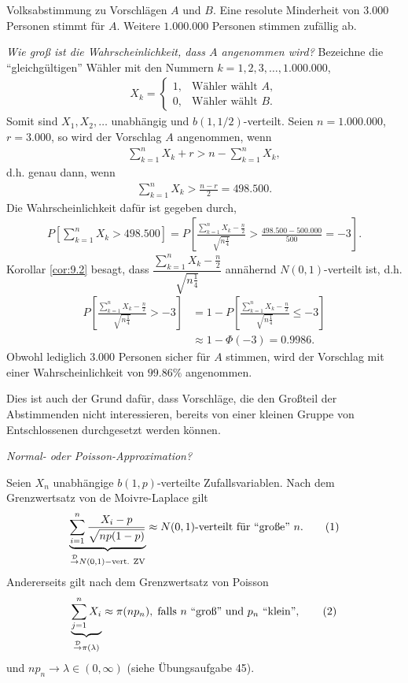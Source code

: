 \begin{bsp}
Volksabstimmung zu Vorschlägen $A$ und $B$. Eine resolute Minderheit
von $3.000$ Personen stimmt für $A$. Weitere $1.000.000$ Personen stimmen
zufällig ab.

\textit{Wie groß ist die Wahrscheinlichkeit, dass $A$ angenommen wird?}
Bezeichne die ``gleichgültigen'' Wähler mit den Nummern
$k=1,2,3,\ldots,1.000.000$,
\begin{align*}
X_k = \begin{cases}
1, & \text{Wähler wählt }A,\\
0, & \text{Wähler wählt }B.
\end{cases}
\end{align*}
Somit sind $X_1,X_2,\ldots$ unabhängig und $b(1,1/2)$-verteilt. Seien
$n=1.000.000$, $r=3.000$, so wird der Vorschlag $A$ angenommen, wenn
\begin{align*}
\sum_{k=1}^n X_k + r > n - \sum\limits_{k=1}^n X_k,
\end{align*}
d.h. genau dann, wenn
\begin{align*}
\sum_{k=1}^n X_k > \frac{n-r}{2} = 498.500.
\end{align*}
Die Wahrscheinlichkeit dafür ist gegeben durch,
\begin{align*}
P[\sum_{k=1}^n X_k > 498.500]
= P\left[\frac{\sum_{k=1}^n X_k - \frac{n}{2}}{\sqrt{n\frac{1}{4}}} >
\frac{498.500 - 500.000}{500} = -3\right].
\end{align*}
Korollar \ref{cor:9.2} besagt, dass $\dfrac{\sum_{k=1}^n X_k -
\frac{n}{2}}{\sqrt{n\frac{1}{4}}}$ annähernd $N(0,1)$-verteilt ist, d.h.
\begin{align*}
P\left[\frac{\sum_{k=1}^n X_k - \frac{n}{2}}{\sqrt{n\frac{1}{4}}} >
-3\right] &= 1- P\left[\frac{\sum_{k=1}^n X_k -
\frac{n}{2}}{\sqrt{n\frac{1}{4}}} \le -3\right]\\ &
 \approx 1-\Phi(-3) = 0.9986.
\end{align*}
Obwohl lediglich 3.000 Personen sicher für $A$ stimmen, wird der Vorschlag
mit einer Wahrscheinlichkeit von $99.86\%$ angenommen.

Dies ist auch der Grund dafür, dass Vorschläge, die den Großteil der
Abstimmenden nicht interessieren, bereits von einer kleinen Gruppe von
Entschlossenen durchgesetzt werden können.\bsphere
\end{bsp}

\noindent
\textit{Normal- oder Poisson-Approximation?} 

Seien $X_n$ unabhängige $b(1,p)$-verteilte Zufallsvariablen. Nach dem
Grenzwertsatz von de Moivre-Laplace gilt
\begin{align*}
\underbrace{\sum_{i=1}^n\frac{X_i-p}{\sqrt{np(1-p)}}}_{\overset{\mathcal{D}}{\to} N(0,1)-\text{vert.
ZV}} \approx N(0,1)\text{-verteilt für ``große'' }n.\tag{1}
\end{align*}
Andererseits gilt nach dem Grenzwertsatz von Poisson
\begin{align*}
\underbrace{\sum_{j=1}^n X_i}_{\overset{\mathcal{D}}{\to} \pi(\lambda)} \approx \pi(np_n),\;
\text{falls $n$ ``groß'' und $p_n$ ``klein''},\tag{2}
\end{align*} 
und $np_n\to \lambda\in (0,\infty)$ (siehe Übungsaufgabe 45).

